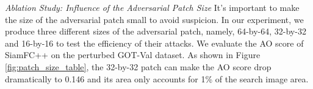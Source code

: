 \documentclass[journal]{IEEEtran}
\begin{document}

\textit{Ablation Study: Influence of the Adversarial Patch Size} 
It's important to make the size of the adversarial patch small to avoid suspicion. In our experiment, we produce three different sizes of the adversarial patch, namely, 64-by-64, 32-by-32 and 16-by-16 to test the efficiency of their attacks. We evaluate the AO score of SiamFC++ on the perturbed GOT-Val dataset.
As shown in Figure \ref{fig:patch_size_table}, the 32-by-32 patch can make the AO score drop dramatically to 0.146 and its area only accounts for 1\% of the search image area.
\end{document}
